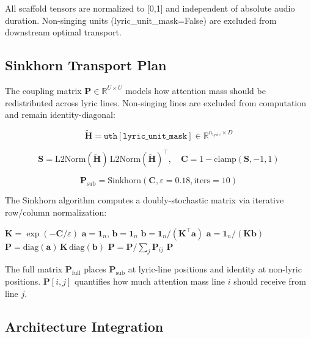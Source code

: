 \documentclass[11pt,a4paper]{article}
\begin{document}
All scaffold tensors are normalized to [0,1] and independent of absolute audio duration. Non-singing units (lyric\_unit\_mask=False) are excluded from downstream optimal transport.

\subsection{Sinkhorn Transport Plan}

The coupling matrix $\mathbf{P} \in \mathbb{R}^{U \times U}$ models how attention mass should be redistributed across lyric lines. Non-singing lines are excluded from computation and remain identity-diagonal:

\[
\tilde{\mathbf{H}} = \texttt{uth}[\texttt{lyric\_unit\_mask}] \in \mathbb{R}^{n_{\text{lyric}} \times D}
\]

\[
\mathbf{S} = \text{L2Norm}(\tilde{\mathbf{H}})\,\text{L2Norm}(\tilde{\mathbf{H}})^\top,
\quad
\mathbf{C} = 1 - \text{clamp}(\mathbf{S}, -1, 1)
\]

\[
\mathbf{P}_{\text{sub}} = \text{Sinkhorn}(\mathbf{C}, \varepsilon=0.18, \text{iters}=10)
\]

The Sinkhorn algorithm computes a doubly-stochastic matrix via iterative row/column normalization:

\begin{algorithm}[H]
\caption{log-domain Sinkhorn}
\begin{algorithmic}[1]
\State $\mathbf{K} = \exp(-\mathbf{C} / \varepsilon)$ 
\State $\mathbf{a} = \mathbf{1}_n$, $\mathbf{b} = \mathbf{1}_n$
    \State $\mathbf{b} = \mathbf{1}_n / (\mathbf{K}^\top \mathbf{a})$
    \State $\mathbf{a} = \mathbf{1}_n / (\mathbf{K} \mathbf{b})$
\EndFor
\State $\mathbf{P} = \text{diag}(\mathbf{a}) \, \mathbf{K} \, \text{diag}(\mathbf{b})$
\State $\mathbf{P} = \mathbf{P} / \sum_j \mathbf{P}_{ij}$ 
\State \Return $\mathbf{P}$
\end{algorithmic}
\end{algorithm}

The full matrix $\mathbf{P}_{\text{full}}$ places $\mathbf{P}_{\text{sub}}$ at lyric-line positions and identity at non-lyric positions. $\mathbf{P}[i, j]$ quantifies how much attention mass line $i$ should receive from line $j$.

\subsection{Architecture Integration}
\end{document}

